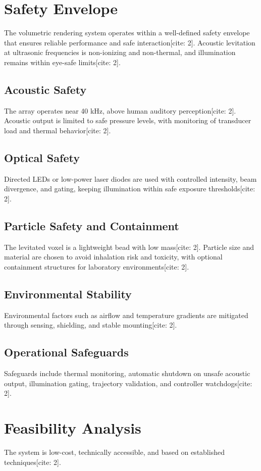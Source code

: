 \documentclass[10pt,twocolumn]{article}
\begin{document}
\section{Safety Envelope}
The volumetric rendering system operates within a well-defined safety envelope that ensures reliable performance and safe interaction[cite: 2]. Acoustic levitation at ultrasonic frequencies is non-ionizing and non-thermal, and illumination remains within eye-safe limits[cite: 2].

\subsection{Acoustic Safety}
The array operates near 40 kHz, above human auditory perception[cite: 2]. Acoustic output is limited to safe pressure levels, with monitoring of transducer load and thermal behavior[cite: 2].

\subsection{Optical Safety}
Directed LEDs or low-power laser diodes are used with controlled intensity, beam divergence, and gating, keeping illumination within safe exposure thresholds[cite: 2].

\subsection{Particle Safety and Containment}
The levitated voxel is a lightweight bead with low mass[cite: 2]. Particle size and material are chosen to avoid inhalation risk and toxicity, with optional containment structures for laboratory environments[cite: 2].

\subsection{Environmental Stability}
Environmental factors such as airflow and temperature gradients are mitigated through sensing, shielding, and stable mounting[cite: 2].

\subsection{Operational Safeguards}
Safeguards include thermal monitoring, automatic shutdown on unsafe acoustic output, illumination gating, trajectory validation, and controller watchdogs[cite: 2].

\section{Feasibility Analysis}
The system is low-cost, technically accessible, and based on established techniques[cite: 2].
\end{document}
